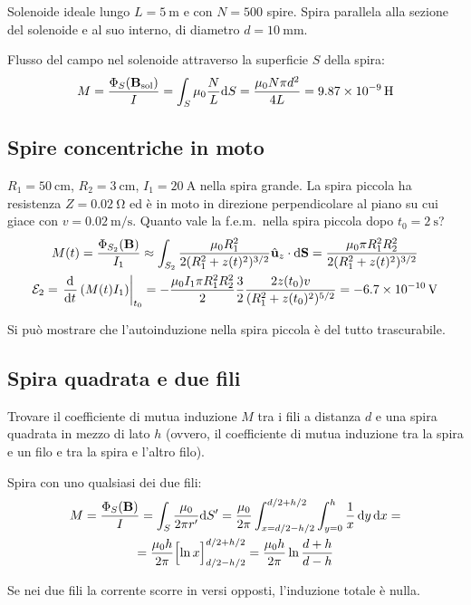 Solenoide ideale lungo $L = \qty{5}{\metre}$ e con $N = 500$ spire.
Spira parallela alla sezione del solenoide e al suo interno, di diametro $d = \qty{10}{\milli\metre}$.

Flusso del campo nel solenoide attraverso la superficie $S$ della spira:
\begin{equation}
    M = \frac{\Phi_S(\B_\text{sol})}{I}
    = \int_S \mu_0 \frac{N}{L} \de S
    = \frac{\mu_0 N \pi d^2}{4 L}
    = \qty{9.87e-9}{\henry}
\end{equation}

\subsection{Spire concentriche in moto}


$R_1 = \qty{50}{\centi\metre}$, $R_2 = \qty{3}{\centi\metre}$, $I_1 = \qty{20}{\ampere}$ nella spira grande.
La spira piccola ha resistenza $Z = \qty{0.02}{\ohm}$ ed è in moto in direzione perpendicolare al piano su cui giace con $v = \qty{0.02}{\metre\per\second}$.
Quanto vale la f.e.m.\ nella spira piccola dopo $t_0 = \qty{2}{\second}$?
\begin{gather}
    M(t) = \frac{\Phi_{S_2}(\B)}{I_1}
    \approx \int_{S_2} \frac{\mu_0 R_1^2}{2 (R_1^2 + z(t)^2)^{3/2}} \uz \sde
    = \frac{\mu_0 \pi R_1^2 R_2^2}{2 (R_1^2 + z(t)^2)^{3/2}} \\
    \fem_2 = \evalat{\der{t} \pts{M(t) I_1}}{t_0}
    = -\frac{\mu_0 I_1 \pi R_1^2 R_2^2}{2}
    \frac{3}{2}
    \frac{2 z(t_0) v}{(R_1^2 + z(t_0)^2)^{5/2}}
    = -\qty{6.7e-10}{\volt}
\end{gather}

Si può mostrare che l'autoinduzione nella spira piccola è del tutto trascurabile.


\subsection{Spira quadrata e due fili}

Trovare il coefficiente di mutua induzione $M$ tra i fili a distanza $d$ e una spira quadrata in mezzo di lato $h$ (ovvero, il coefficiente di mutua induzione tra la spira e un filo e tra la spira e l'altro filo).

Spira con uno qualsiasi dei due fili:
\begin{equation}
\begin{gathered}
    M = \frac{\Phi_S(\mathbf{B})}{I}
    = \int_S \frac{\mu_0}{2\pi r'} \mathrm{d} S'
    = \frac{\mu_0}{2\pi} \int_{x = d/2 - h/2}^{d/2 + h/2} \int_{y = 0}^h \frac{1}{x} \, \mathrm{d} y \, \mathrm{d} x = \\
    = \frac{\mu_0 h}{2\pi} \Big[\!\ln x\Big]_{d/2 - h/2}^{d/2 + h/2}
    = \frac{\mu_0 h}{2\pi} \ln \frac{d + h}{d - h}
\end{gathered}
\end{equation}

Se nei due fili la corrente scorre in versi opposti, l'induzione totale è nulla.
